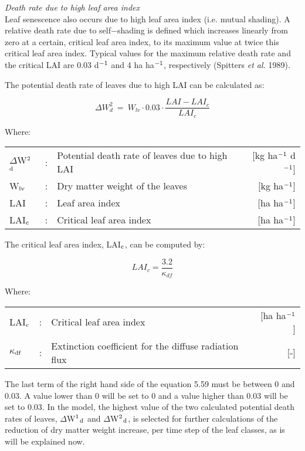 {\it Death rate due to high leaf area index}\\
Leaf senescence also occurs due to high leaf area index (i.e. mutual shading). A relative
death rate due to self$-$shading is defined which increases linearly from zero at a certain,
critical leaf area index, to its maximum value at twice this critical leaf area index. Typical
values for the maximum relative death rate and the critical LAI are 0.03 d$^{{\rm -1}}$ and 4 
ha ha$^{{\rm -}{1}}$, respectively (Spitters {\it et al.} 1989).

The potential death rate of leaves due to high LAI can be calculated as:

\begin{equation}
\Delta W_{d}^{2} ~=~ W_{lv} \cdot 0.03 \cdot {\frac{LAI - LAI_c}{LAI_c}}
\end{equation}

Where:\\[5pt]
\begin{tabularx}{\textwidth}{llXr}
	$\Delta$W$^{{\rm 2}}$$_{{\rm d}}$ &:& Potential death rate of leaves due to 
	high LAI   &    [kg ha$^{{\rm -1}}$ d$^{{\rm -1}}$]\\
	W$_{{\rm lv}}$ &:& Dry matter weight of the leaves  &  [kg ha$^{{\rm -1}}$]\\
	LAI &:& Leaf area index   &    [ha ha$^{{\rm -1}}$]\\
	LAI$_{{\rm c}}$ &:& Critical leaf area index   &     [ha ha$^{{\rm -1}}$]\\
\end{tabularx}

The critical leaf area index, LAI$_{{\rm c}}$, can be computed by:

\begin{equation}
LAI_{c} = {\frac{3.2}{\kappa_{df} }}
\end{equation}

Where:\\[5pt]
\begin{tabularx}{\textwidth}{llXr}
	LAI$_{{\rm c}}$ &:& Critical leaf area index    &    [ha ha$^{{\rm -1}}$]\\
	$\kappa$$_{{\rm df}}$ &:& Extinction coefficient for 
	the diffuse radiation flux   &    [-]\\
\end{tabularx}

The last term of the right hand side of the equation 5.59 must be between 0 and 0.03. A 
value lower than 0 will be set to 0 and a value higher than 0.03 will be set to 0.03. In the
model, the highest value of the two calculated potential death rates of leaves, 
$\Delta$W$^{{\rm 1}}$$_{{\rm d}}$ and $\Delta$W$^{{\rm 2}}$$_{{\rm d}}$, is selected 
for further calculations of the reduction of dry matter weight increase,
per time step of the leaf classes, as is will be explained now. 

